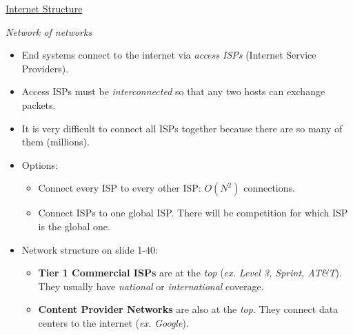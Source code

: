 \documentclass{article}
\begin{document}
\underline{Internet Structure}\\
\vspace{-4mm}

{\it Network of networks}

\begin{itemize}
\item End systems connect to the internet via {\it access ISPs} (Internet Service Providers).
\item Access ISPs must be {\it interconnected} so that any two hosts can exchange packets.
\item It is very difficult to connect all ISPs together because there are so many of them (millions).
\item Options:
\begin{itemize}
\item Connect every ISP to every other ISP: $O(N^2)$ connections.
\item Connect ISPs to one global ISP. There will be competition for which ISP is the global one.
\end{itemize}
\item Network structure on slide 1-40:
\begin{itemize}
\item {\bf Tier 1 Commercial ISPs} are at the {\it top} ({\it ex. Level 3, Sprint, AT\&T}). They usually have {\it national} or {\it international} coverage.
\item {\bf Content Provider Networks} are also at the {\it top}. They connect data centers to the internet ({\it ex. Google}).
\end{itemize}
\end{itemize}
\end{document}
